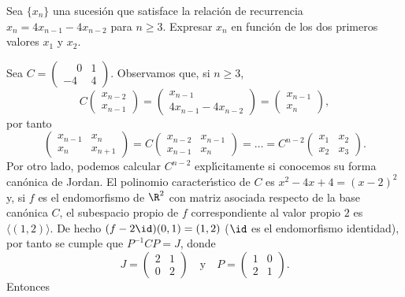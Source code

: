\begin{ejercicio}\label{ej:Recurrencia}
Sea $\{x_n\}$ una sucesi\'on que satisface la relaci\'on de recurrencia $x_n=4x_{n-1}-4x_{n-2}$ para $n\geq 3$. Expresar $x_n$ en funci\'on de los dos primeros valores $x_1$ y $x_2$.
\end{ejercicio}

\begin{solucion}
Sea $C=\begin{pmatrix}\phantom{-}0&1\\-4&4\end{pmatrix}$. Observamos que, si $n\geq 3$,
$$C\begin{pmatrix}x_{n-2}\\ x_{n-1}\end{pmatrix}=
\begin{pmatrix}x_{n-1}\\ 4x_{n-1}-4x_{n-2}\end{pmatrix}
=\begin{pmatrix}x_{n-1}\\ x_n\end{pmatrix},$$
por tanto
\begin{equation}\label{RelacionMatricial}\begin{pmatrix}x_{n-1}&x_n\\ x_n&x_{n+1}\end{pmatrix}=
C\begin{pmatrix}x_{n-2}&x_{n-1}\\ x_{n-1}&x_n\end{pmatrix}=\dots =
C^{n-2}\begin{pmatrix}x_1&x_2\\ x_2&x_3\end{pmatrix}.\end{equation}
Por otro lado, podemos calcular $C^{n-2}$ expl\'\i citamente si conocemos su forma can\'onica de Jordan. El polinomio caracter\'\i stico de $C$ es $x^2-4x+4=(x-2)^2$ y, si $f$ es el endomorfismo de $\R^2$ con matriz asociada respecto de la base can\'onica $C$, el subespacio propio de $f$ correspondiente al valor propio $2$ es $\langle (1,2)\rangle$. De hecho $(f-2\id)(0,1)=(1,2)$ ($\id$ es el endomorfismo identidad), por tanto se cumple que $P^{-1}CP=J$, donde
$$J=\begin{pmatrix} 2&1\\ 0&2\end{pmatrix}\quad\text{y}\quad P=\begin{pmatrix} 1&0\\ 2&1\end{pmatrix}.$$ Entonces

\end{solucion}
